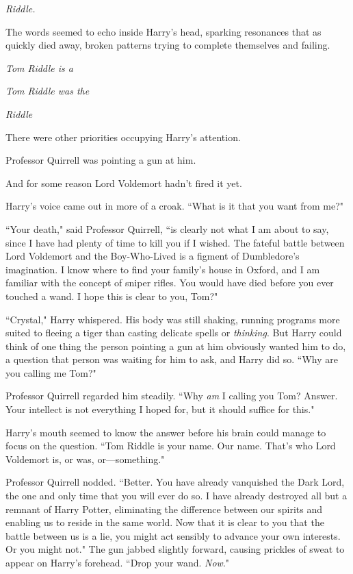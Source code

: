 
 \emph{Riddle.}

\hplettrineextrapara
The words seemed to echo inside Harry's head, sparking resonances that as quickly died away, broken patterns trying to complete themselves and failing.

\emph{Tom Riddle is a}

\emph{Tom Riddle was the}

\emph{Riddle}

There were other priorities occupying Harry's attention.

Professor Quirrell was pointing a gun at him.

And for some reason Lord Voldemort hadn't fired it yet.

Harry's voice came out in more of a croak. ``What is it that you want from me?"

``Your death," said Professor Quirrell, ``is clearly not what I am about to say, since I have had plenty of time to kill you if I wished. The fateful battle between Lord Voldemort and the Boy-Who-Lived is a figment of Dumbledore's imagination. I know where to find your family's house in Oxford, and I am familiar with the concept of sniper rifles. You would have died before you ever touched a wand. I hope this is clear to you, Tom?"

``Crystal," Harry whispered. His body was still shaking, running programs more suited to fleeing a tiger than casting delicate spells or \emph{thinking}. But Harry could think of one thing the person pointing a gun at him obviously wanted him to do, a question that person was waiting for him to ask, and Harry did so. ``Why are you calling me Tom?"

Professor Quirrell regarded him steadily. ``Why \emph{am} I calling you Tom? Answer. Your intellect is not everything I hoped for, but it should suffice for this."

Harry's mouth seemed to know the answer before his brain could manage to focus on the question. ``Tom Riddle is your name. Our name. That's who Lord Voldemort is, or was, or—something."

Professor Quirrell nodded. ``Better. You have already vanquished the Dark Lord, the one and only time that you will ever do so. I have already destroyed all but a remnant of Harry Potter, eliminating the difference between our spirits and enabling us to reside in the same world. Now that it is clear to you that the battle between us is a lie, you might act sensibly to advance your own interests. Or you might not." The gun jabbed slightly forward, causing prickles of sweat to appear on Harry's forehead. ``Drop your wand. \emph{Now}."

